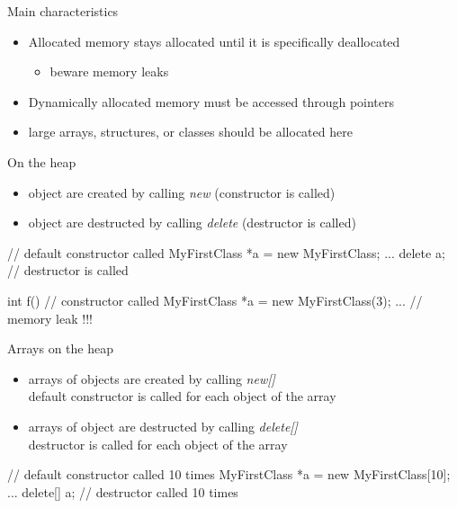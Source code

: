 \begin{frame}[fragile]
  \begin{block}{Main characteristics}
    \begin{itemize}
    \item Allocated memory stays allocated until it is specifically deallocated
      \begin{itemize}
      \item beware memory leaks
      \end{itemize}
    \item Dynamically allocated memory must be accessed through pointers
    \item large arrays, structures, or classes should be allocated here
    \end{itemize}
  \end{block}
\end{frame}

\begin{frame}[fragile]
  \begin{block}{On the heap}
    \begin{itemize}
    \item object are created by calling {\it new} (constructor is called)
    \item object are destructed by calling {\it delete} (destructor is called)
    \end{itemize}
  \end{block}
  \begin{cppcode}
    {
      // default constructor called
      MyFirstClass *a = new MyFirstClass;
      ...
      delete a; // destructor is called
    }

    int f() {
      // constructor called
      MyFirstClass *a = new MyFirstClass(3);
      ...
    } // memory leak !!!
  \end{cppcode}
\end{frame}

\begin{frame}[fragile]
  \begin{block}{Arrays on the heap}
    \begin{itemize}
    \item arrays of objects are created by calling {\it new[]} \\
      default constructor is called for each object of the array
    \item arrays of object are destructed by calling {\it delete[]} \\
      destructor is called for each object of the array
    \end{itemize}
  \end{block}
  \begin{cppcode}
    {
      // default constructor called 10 times
      MyFirstClass *a = new MyFirstClass[10];
      ...
      delete[] a; // destructor called 10 times
    }
  \end{cppcode}
\end{frame}

